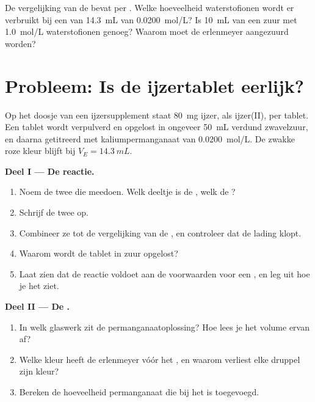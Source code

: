 \begin{exercise}[$\star\star\star$]\label{exo:g11:titration:15}
De vergelijking van de  bevat  per . Welke
hoeveelheid waterstofionen wordt er verbruikt bij een 
van \qty{14.3}{mL} van \qty{0.0200}{mol/L}? Is \qty{10}{mL} van een zuur
met \qty{1.0}{mol/L} waterstofionen genoeg? Waarom moet de erlenmeyer
aangezuurd worden?
\end{exercise}

\section{Probleem: Is de ijzertablet eerlijk?}

\begin{problem}
\label{pb:g11:titration:1}
Op het doosje van een ijzersupplement staat \qty{80}{mg} ijzer, als
ijzer(II), per tablet. Een tablet wordt verpulverd en opgelost in
ongeveer \qty{50}{mL} verdund zwavelzuur, en daarna getitreerd met
kaliumpermanganaat van \qty{0.0200}{mol/L}. De zwakke roze kleur blijft
bij $V_E = \qty{14.3}{mL}$.

\medskip
\noindent\textbf{Deel I --- De reactie.}
\begin{enumerate}
  \item Noem de twee  die meedoen. Welk deeltje is de
        , welk de ?
  \item Schrijf de twee  op.
  \item Combineer ze tot de vergelijking van de , en controleer
        dat de lading klopt.
  \item Waarom wordt de tablet in zuur opgelost?
  \item Laat zien dat de reactie voldoet aan de voorwaarden voor een
        , en leg uit hoe je het  ziet.
\end{enumerate}

\medskip
\noindent\textbf{Deel II --- De .}
\begin{enumerate}[resume]
  \item In welk glaswerk zit de permanganaatoplossing? Hoe lees je het
        volume ervan af?
  \item Welke kleur heeft de erlenmeyer vóór het , en
        waarom verliest elke druppel zijn kleur?
  \item Bereken de hoeveelheid permanganaat die bij het 
        is toegevoegd.
\end{enumerate}


\end{problem}
